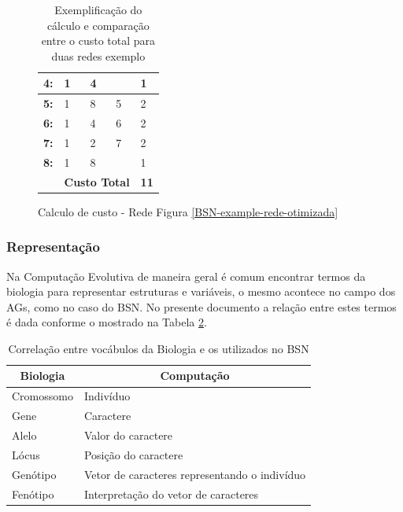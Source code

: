 \begin{table}[t!]
\begin{subfigure}[t]{0.4\textwidth}
\begin{tabular}{lllll}
			\multicolumn{1}{|l|}{\textbf{4:}} & 1 & 4 & \multicolumn{1}{l|}{} & \multicolumn{1}{l|}{1} \\ \hline
			\multicolumn{1}{|l|}{\textbf{5:}} & 1 & 8 & \multicolumn{1}{l|}{5} & \multicolumn{1}{l|}{2} \\ \hline
			\multicolumn{1}{|l|}{\textbf{6:}} & 1 & 4 & \multicolumn{1}{l|}{6} & \multicolumn{1}{l|}{2} \\ \hline
			\multicolumn{1}{|l|}{\textbf{7:}} & 1 & 2 & \multicolumn{1}{l|}{7} & \multicolumn{1}{l|}{2} \\ \hline
			\multicolumn{1}{|l|}{\textbf{8:}} & 1 & 8 & \multicolumn{1}{l|}{} & \multicolumn{1}{l|}{1} \\ \hline
			 & \multicolumn{3}{l}{\textbf{Custo Total}} & \textbf{11}
			\end{tabular}
	\caption{Calculo de custo - Rede Figura \ref{BSN-example-rede-otimizada}}
	\label{tab-custo-rede-bsn-otimizada}
	\end{subfigure}
	\caption[Exemplo de cálculo de custo total em rede]{Exemplificação do cálculo e comparação entre o custo total para duas redes exemplo}
	\label{tab_calc_custo}
\end{table}

\subsubsection{Representação}
\label{sec-representacao}
Na Computação Evolutiva de maneira geral é comum encontrar termos da biologia para representar estruturas e variáveis, o mesmo acontece no campo dos AGs, como no caso do BSN. No presente documento a relação entre estes termos é dada conforme o mostrado na Tabela \ref{tab-correlacao-bio-comp}.

\begin{table}[ht]
\centering
\begin{tabular}{|l|l|}
\hline
\multicolumn{1}{|c|}{\textbf{Biologia}} & \multicolumn{1}{c|}{\textbf{Computação}} \\ \hline
Cromossomo & Indivíduo \\ \hline
Gene & Caractere \\ \hline
Alelo & Valor do caractere \\ \hline
Lócus & Posição do caractere \\ \hline
Genótipo & Vetor de caracteres representando o indivíduo \\ \hline
Fenótipo & Interpretação do vetor de caracteres \\ \hline
\end{tabular}
\caption[Biologia x BSN]{Correlação entre vocábulos da Biologia e os utilizados no BSN}
\label{tab-correlacao-bio-comp}
\end{table}  

